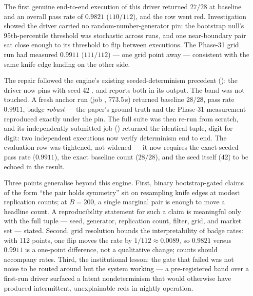 The first genuine end-to-end execution of this driver returned $27/28$ at
baseline and an overall pass rate of $0.9821$ ($110/112$), and the row went
red. Investigation showed the driver carried no random-number-generator pin:
the bootstrap null's 95th-percentile threshold was stochastic across runs,
and one near-boundary pair sat close enough to its threshold to flip between
executions. The Phase-31 grid run had measured $0.9911$ ($111/112$) --- one
grid point away --- consistent with the same knife edge landing on the other
side.

The repair followed the engine's existing seeded-determinism precedent
(): the driver now pins 
with seed 42 \cite{lecuyer1999}, and reports both in its output. The band
was not touched. A fresh anchor run (job ,
773.5\,s) returned baseline $28/28$, pass rate $0.9911$, badge
\emph{robust} --- the paper's ground truth and the Phase-31 measurement
reproduced exactly under the pin. The full suite was then re-run from
scratch, and its independently submitted job
() returned the identical tuple, digit for
digit: two independent executions now verify determinism end to end. The
evaluation row was tightened, not widened --- it now requires the exact
seeded pass rate ($0.9911$), the exact baseline count ($28/28$), and the
seed itself ($42$) to be echoed in the result.

Three points generalise beyond this engine. First, binary bootstrap-gated
claims of the form ``the pair holds symmetry'' sit on resampling knife edges
at modest replication counts; at $B=200$, a single marginal pair is enough to
move a headline count. A reproducibility statement for such a claim is
meaningful only with the full tuple --- seed, generator, replication count,
filter, grid, and market set --- stated. Second, grid resolution bounds the
interpretability of badge rates: with 112 points, one flip moves the rate by
$1/112 \approx 0.0089$, so $0.9821$ versus $0.9911$ is a one-point
difference, not a qualitative change; counts should accompany rates. Third,
the institutional lesson: the gate that failed was not noise to be routed
around but the system working --- a pre-registered band over a first-run
driver surfaced a latent nondeterminism that would otherwise have produced
intermittent, unexplainable reds in nightly operation.

